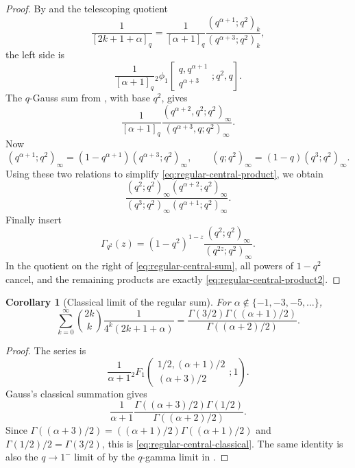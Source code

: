 \documentclass[11pt,oneside,openany]{book}
\newtheorem{corollary}[theorem]{Corollary}
\theoremstyle{definition}
\theoremstyle{remark}
\begin{document}
\begin{proof}
By  and the telescoping quotient
\[
 \frac1{[2k+1+\alpha]_q}
 =\frac1{[\alpha+1]_q}
   \frac{(q^{\alpha+1};q^2)_k}
        {(q^{\alpha+3};q^2)_k},
\]
the left side is
\[
 \frac1{[\alpha+1]_q}
 {}_2\phi_1\!\left[
 \begin{matrix}q,q^{\alpha+1}\\q^{\alpha+3}\end{matrix};
 q^2,q\right].
\]
The $q$-Gauss sum from , with base $q^2$, gives
\[
 \frac1{[\alpha+1]_q}
 \frac{(q^{\alpha+2},q^2;q^2)_\infty}
      {(q^{\alpha+3},q;q^2)_\infty}.
 \tag{18.3}\label{eq:regular-central-product}
\]
Now
\[
 (q^{\alpha+1};q^2)_\infty
 =(1-q^{\alpha+1})(q^{\alpha+3};q^2)_\infty,
 \qquad
 (q;q^2)_\infty=(1-q)(q^3;q^2)_\infty.
\]
Using these two relations to simplify \eqref{eq:regular-central-product}, we obtain
\[
 \frac{(q^2;q^2)_\infty(q^{\alpha+2};q^2)_\infty}
 {(q^3;q^2)_\infty(q^{\alpha+1};q^2)_\infty}.
 \tag{18.4}\label{eq:regular-central-product2}
\]
Finally insert
\[
 \Gamma_{q^2}(z)
 =(1-q^2)^{1-z}
 \frac{(q^2;q^2)_\infty}{(q^{2z};q^2)_\infty}.
\]
In the quotient on the right of \eqref{eq:regular-central-sum}, all powers of $1-q^2$ cancel, and the remaining products are exactly \eqref{eq:regular-central-product2}.
\end{proof}

\begin{corollary}[Classical limit of the regular sum]\label{cor:regular-central-classical}
For $\alpha\notin\{-1,-3,-5,\ldots\}$,
\[
 \sum_{k=0}^{\infty}\binom{2k}{k}
 \frac1{4^k(2k+1+\alpha)}
 =\frac{\Gamma(3/2)\Gamma((\alpha+1)/2)}
        {\Gamma((\alpha+2)/2)}.
 \tag{18.5}\label{eq:regular-central-classical}
\]
\end{corollary}

\begin{proof}
The series is
\[
 \frac1{\alpha+1}
 {}_2F_1\!\left(
 \begin{matrix}1/2,(\alpha+1)/2\\(\alpha+3)/2\end{matrix};1\right).
\]
Gauss's classical summation gives
\[
 \frac1{\alpha+1}
 \frac{\Gamma((\alpha+3)/2)\Gamma(1/2)}
      {\Gamma((\alpha+2)/2)}.
\]
Since $\Gamma((\alpha+3)/2)=((\alpha+1)/2)\Gamma((\alpha+1)/2)$ and $\Gamma(1/2)/2=\Gamma(3/2)$, this is \eqref{eq:regular-central-classical}.  The same identity is also the $q\to1^-$ limit of  by the $q$-gamma limit in .
\end{proof}
\end{document}
